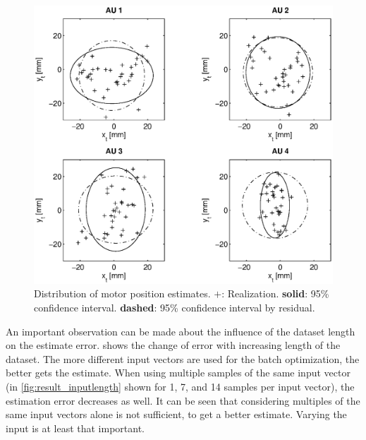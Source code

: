 \begin{figure}[hbtp]
\centering
\includegraphics[width = \textwidth]{images/results/confidence_95_interval.eps}
\caption{Distribution of motor position estimates. $\mathbf{+}$: Realization. \textbf{solid}: 95\% confidence interval. \textbf{dashed}: 95\% confidence interval by residual.}
\label{fig:result_95pc_confidence}
\end{figure}



An important observation can be made about the influence of the dataset length on the estimate error.
 shows the change of error with increasing length of the dataset.
The more different input vectors are used for the batch optimization, the better gets the estimate.
When using multiple samples of the same input vector (in \cref{fig:result_inputlength} shown for 1, 7, and 14 samples per input vector), the estimation error decreases as well.
It can be seen that considering multiples of the same input vectors alone is not sufficient, to get a better estimate.
Varying the input is at least that important.

